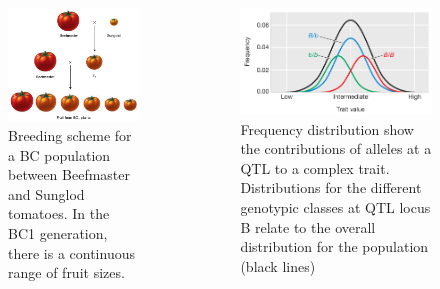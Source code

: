\documentclass[
  ignorenonframetext,
  aspectratio=169]{beamer}
\newcommand{\bcolumns}{\begin{columns}[T, onlytextwidth]}
\newcommand{\ecolumns}{\end{columns}}
\begin{document}
\begin{frame}{}
\protect\hypertarget{section-4}{}
\bcolumns
{}

\begin{figure}
\includegraphics[width=0.72\linewidth]{../images/tomato-beefmaster-sungold-cross} \caption{Breeding scheme for a BC population between Beefmaster and Sunglod tomatoes. In the BC1 generation, there is a continuous range of fruit sizes.}\label{fig:tomato-beefmaster-sungold-cross}
\end{figure}


\begin{figure}
\includegraphics[width=0.92\linewidth]{../images/frequency_distribution_showing_contribution_qtl} \caption{Frequency distribution show the contributions of alleles at a QTL to a complex trait. Distributions for the different genotypic classes at QTL locus B relate to the overall distribution for the population (black lines)}\label{fig:allele-freq-distribution}
\end{figure}

\ecolumns
\end{frame}
\end{document}
